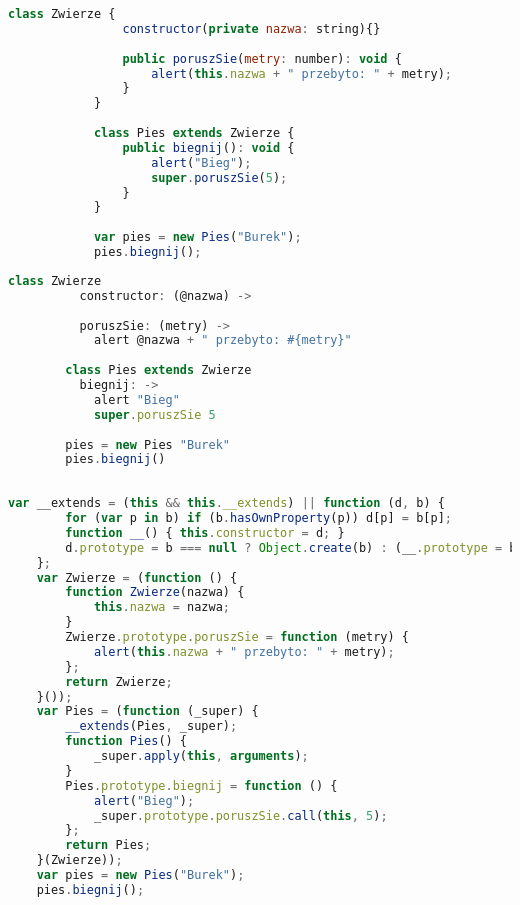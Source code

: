 \begin{minipage}[t]{.50\linewidth}
\begin{lstlisting}[language=JavaScript,basicstyle=\small,frame=top,title={Kod TypeScript}]
			class Zwierze {
			    constructor(private nazwa: string){}
			    
				public poruszSie(metry: number): void {
					alert(this.nazwa + " przebyto: " + metry);
				}
			}
			
			class Pies extends Zwierze {
				public biegnij(): void {
					alert("Bieg");
					super.poruszSie(5);
				}
			}
			
			var pies = new Pies("Burek");
			pies.biegnij();
		\end{lstlisting}
\end{minipage} 
\begin{minipage}[t]{.50\linewidth}
\begin{lstlisting}[language=JavaScript,basicstyle=\small,frame=top,title={Kod CoffeeScript}]
		class Zwierze
		  constructor: (@nazwa) ->
		
		  poruszSie: (metry) ->
		    alert @nazwa + " przebyto: #{metry}"
		
		class Pies extends Zwierze
		  biegnij: ->
		    alert "Bieg"
		    super.poruszSie 5
		    
		pies = new Pies "Burek"
		pies.biegnij()
		 
\end{lstlisting}
\end{minipage}

\begin{lstlisting}[language=JavaScript,basicstyle=\small,frame=top,title={Kod JavaScript}]
	var __extends = (this && this.__extends) || function (d, b) {
	    for (var p in b) if (b.hasOwnProperty(p)) d[p] = b[p];
	    function __() { this.constructor = d; }
	    d.prototype = b === null ? Object.create(b) : (__.prototype = b.prototype, new __());
	};
	var Zwierze = (function () {
	    function Zwierze(nazwa) {
	        this.nazwa = nazwa;
	    }
	    Zwierze.prototype.poruszSie = function (metry) {
	        alert(this.nazwa + " przebyto: " + metry);
	    };
	    return Zwierze;
	}());
	var Pies = (function (_super) {
	    __extends(Pies, _super);
	    function Pies() {
	        _super.apply(this, arguments);
	    }
	    Pies.prototype.biegnij = function () {
	        alert("Bieg");
	        _super.prototype.poruszSie.call(this, 5);
	    };
	    return Pies;
	}(Zwierze));
	var pies = new Pies("Burek");
	pies.biegnij();
\end{lstlisting} 	

